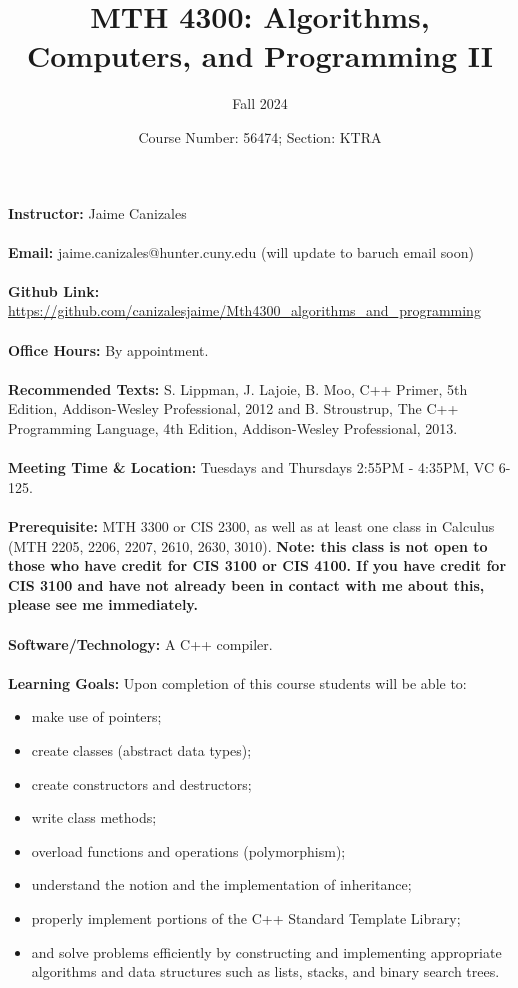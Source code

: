 \documentclass[a4paper]{article}
\title{MTH 4300: Algorithms, Computers, and Programming II}
\author{Fall 2024}
\date{Course Number: 56474; Section: KTRA}
\begin{document}
\maketitle

\textbf{Instructor:} Jaime Canizales\\\\
\textbf{Email:} jaime.canizales@hunter.cuny.edu (will update to baruch email soon)\\\\
\textbf{Github Link:} \url{https://github.com/canizalesjaime/Mth4300_algorithms_and_programming}\\\\
\textbf{Office Hours:} By appointment. \\\\
\textbf{Recommended Texts:} S. Lippman, J. Lajoie, B. Moo, C++ Primer, 5th Edition, Addison-Wesley
Professional, 2012 and B. Stroustrup, The C++ Programming Language, 4th Edition, Addison-Wesley
Professional, 2013.\\\\
\textbf{Meeting Time \& Location:} Tuesdays and Thursdays 2:55PM - 4:35PM, VC 6-125.\\\\
\textbf{Prerequisite:} MTH 3300 or CIS 2300, as well as at least one class in Calculus (MTH 2205, 2206, 2207,
2610, 2630, 3010). \textbf{Note: this class is not open to those who have credit for CIS 3100 or
CIS 4100. If you have credit for CIS 3100 and have not already been in contact with me
about this, please see me immediately.}\\\\
\textbf{Software/Technology:} A C++ compiler. \\\\
\textbf{Learning Goals:} Upon completion of this course students will be able to:
\begin{itemize}
    \item make use of pointers;
    \item create classes (abstract data types);
    \item create constructors and destructors;
    \item write class methods;
    \item overload functions and operations (polymorphism);
    \item understand the notion and the implementation of inheritance;
    \item properly implement portions of the C++ Standard Template Library;
    \item and solve problems efficiently by constructing and implementing appropriate algorithms and
    data structures such as lists, stacks, and binary search trees.
\end{itemize}
\end{document}
